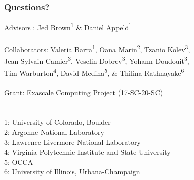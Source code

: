 \documentclass{beamer}
\begin{document}
\begin{frame}
\begin{center}
\frametitle{Questions?}

{\flushleft

Advisors : \hspace{5mm} Jed Brown\textsuperscript{1} \& Daniel Appel\"{o}\textsuperscript{1}\\

~\\

Collaborators: Valeria Barra\textsuperscript{1}, Oana Marin\textsuperscript{2}, Tzanio Kolev\textsuperscript{3},\\
\hspace{23mm} Jean-Sylvain Camier\textsuperscript{3}, Veselin Dobrev\textsuperscript{3}, Yohann Doudouit\textsuperscript{3},\\
\hspace{23mm} Tim Warburton\textsuperscript{4}, David Medina\textsuperscript{5}, \& Thilina Rathnayake\textsuperscript{6}\\

~\\

Grant: \hspace{11mm} Exascale Computing Project (17-SC-20-SC)\\

~\\

~\\

\small{1: University of Colorado, Boulder\\
2: Argonne National Laboratory\\
3: Lawrence Livermore National Laboratory\\
4: Virginia Polytechnic Institute and State University\\
5: OCCA\\
6: University of Illinois, Urbana-Champaign\\}}

\end{center}
\end{frame}


\begin{frame}[noframenumbering]
\titlepage %
\end{frame}


\end{document}
